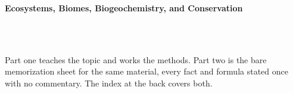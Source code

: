 



\makeindex[title={Index of This Volume},columns=2,intoc]

\begin{titlepage}\thispagestyle{empty}
\vspace*{0.14\textheight}
\noindent{\color{tiercore}\rule{\textwidth}{5pt}}\\[3pt]
\noindent{\color{bioline}\rule{\textwidth}{1pt}}\\[26pt]
\\[12pt]
\noindent\begin{minipage}{\textwidth}\raggedright
{\sffamily\bfseries\fontsize{28}{32}\selectfont\color{bioink}%
 \hyphenchar{} Ecosystems, Biomes, Biogeochemistry, and Conservation\par}\end{minipage}\\[16pt]
\noindent{\color{biogreen}\rule{\textwidth}{1.4pt}}\\[10pt]
\noindent\begin{minipage}{\textwidth}\raggedright
{\fontsize{10.5}{14}\selectfont\color{biogreen}%
Part one teaches the topic and works the methods. Part two is the bare memorization sheet for the
same material, every fact and formula stated once with no commentary. The index at the back covers both.\par}\end{minipage}
\vfill
\noindent{\color{bioline}\rule{\textwidth}{1pt}}\\[3pt]
\noindent{\color{tiercore}\rule{\textwidth}{5pt}}
\end{titlepage}
\tableofcontents
\clearpage
{}
\clearpage
\printindex

